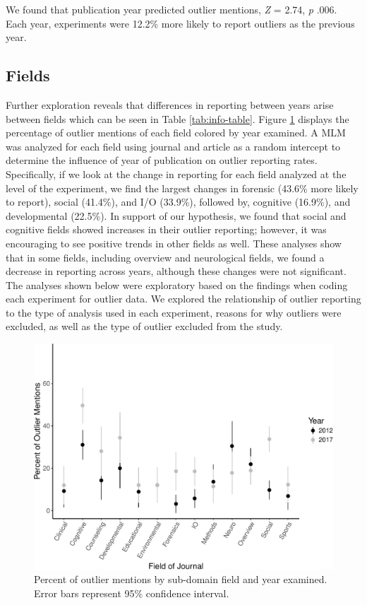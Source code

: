 \documentclass[english,,man]{apa6}
\begin{document}
We found that publication year predicted outlier mentions, \emph{Z} = 2.74, \emph{p} .006. Each year, experiments were 12.2\% more likely to report outliers as the previous year.

\hypertarget{fields-1}{%
\subsection{Fields}\label{fields-1}}

Further exploration reveals that differences in reporting between years arise between fields which can be seen in Table \ref{tab:info-table}. Figure \ref{fig:type-graph} displays the percentage of outlier mentions of each field colored by year examined. A MLM was analyzed for each field using journal and article as a random intercept to determine the influence of year of publication on outlier reporting rates. Specifically, if we look at the change in reporting for each field analyzed at the level of the experiment, we find the largest changes in forensic (43.6\% more likely to report), social (41.4\%), and I/O (33.9\%), followed by, cognitive (16.9\%), and developmental (22.5\%). In support of our hypothesis, we found that social and cognitive fields showed increases in their outlier reporting; however, it was encouraging to see positive trends in other fields as well. These analyses show that in some fields, including overview and neurological fields, we found a decrease in reporting across years, although these changes were not significant.
The analyses shown below were exploratory based on the findings when coding each experiment for outlier data. We explored the relationship of outlier reporting to the type of analysis used in each experiment, reasons for why outliers were excluded, as well as the type of outlier excluded from the study.

\begin{figure}
\centering
\includegraphics{outliers_manuscript_files/figure-latex/type-graph-1.pdf}
\caption{\label{fig:type-graph}Percent of outlier mentions by sub-domain field and year examined. Error bars represent 95\% confidence interval.}
\end{figure}
\end{document}
